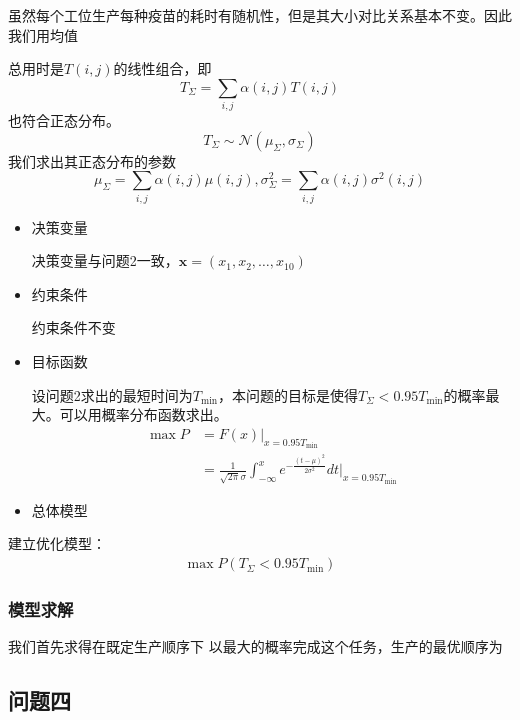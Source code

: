 \documentclass[UTF8]{ctexart}
\begin{document}
	虽然每个工位生产每种疫苗的耗时有随机性，但是其大小对比关系基本不变。因此我们用均值
	\par 总用时是$T(i,j)$的线性组合，即
	\begin{equation}
	T_{\Sigma}=\sum_{i,j}\alpha(i,j)T(i,j)
	\end{equation}
	也符合正态分布。
	\begin{equation}
	T_{\Sigma}\sim\mathcal{N}(\mu_{\Sigma},\sigma_{\Sigma})
	\end{equation}
	我们求出其正态分布的参数
	\begin{equation}
		\mu_{\Sigma}=\sum_{i,j}\alpha(i,j)\mu(i,j),\sigma_{\Sigma}^{2}=\sum_{i,j}\alpha(i,j)\sigma^{2}(i,j)
	\end{equation}
	\begin{itemize}
	\item 决策变量
	\par 决策变量与问题2一致，$\boldsymbol{x}=(x_{1},x_{2},\dots,x_{10})$
	\item 约束条件
	\par 约束条件不变
	\item 目标函数
	\par 设问题2求出的最短时间为$T_{\min}$，本问题的目标是使得$T_{\Sigma}<0.95T_{\min}$的概率最大。可以用概率分布函数求出。
	\begin{equation}
        	\begin{split}
        	\max P&=F(x)|_{x=0.95T_{\min}}\\
			&=\frac{1}{\sqrt{2\pi}\sigma}\int^{x}_{-\infty}e^{-\frac{(t-\mu)^2}{2\sigma^2}}dt|_{x=0.95T_{\min}}
        	\end{split}
	\end{equation}
	\item 总体模型
	\end{itemize}
	\par 建立优化模型：
	\begin{equation}
	\begin{split}
	\max P(T_{\Sigma}<0.95T_{\min})
	\end{split}
	\end{equation}
	\subsubsection{模型求解}
	我们首先求得在既定生产顺序下
	以最大的概率完成这个任务，生产的最优顺序为
	
	\subsection{问题四}
\end{document}

